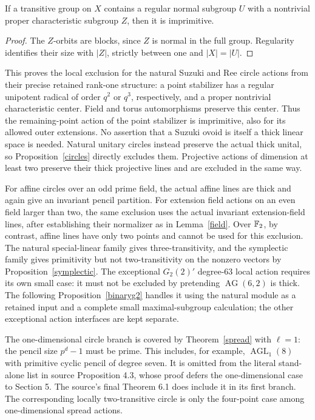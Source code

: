 \begin{lemma}
If a transitive group on $X$ contains a regular normal subgroup $U$
with a nontrivial proper characteristic subgroup $Z$, then it is
imprimitive.
\end{lemma}
\begin{proof}
The $Z$-orbits are blocks, since $Z$ is normal in the full group.
Regularity identifies their size with $|Z|$, strictly between one and
$|X|=|U|$.
\end{proof}

This proves the local exclusion for the natural Suzuki and Ree circle
actions from their precise retained rank-one structure: a point
stabilizer has a regular unipotent radical of order $q^2$ or $q^3$,
respectively, and a proper nontrivial characteristic center. Field and
torus automorphisms preserve this center. Thus the remaining-point
action of the point stabilizer is imprimitive, also for its allowed
outer extensions. No assertion that a Suzuki ovoid is itself a thick
linear space is needed. Natural unitary circles instead preserve the
actual thick unital, so Proposition~\ref{circles} directly excludes them.
Projective actions of dimension at least two preserve their thick
projective lines and are excluded in the same way.

For affine circles over an odd prime field, the actual affine lines
are thick and again give an invariant pencil partition. For extension
field actions on an even field larger than two, the same exclusion
uses the actual invariant extension-field lines, after establishing
their normalizer as in Lemma~\ref{field}. Over $\mathbb F_2$, by contrast,
affine lines have only two points and cannot be used for this exclusion.
The natural special-linear family gives three-transitivity, and the
symplectic family gives primitivity but not two-transitivity on the
nonzero vectors by Proposition~\ref{symplectic}. The exceptional
$G_2(2)'$ degree-63 local action requires its own small case: it must
not be excluded by pretending $\operatorname{AG}(6,2)$ is thick.
The following Proposition~\ref{binaryg2} handles it using the natural
module as a retained input and a complete small maximal-subgroup
calculation; the other exceptional action interfaces are kept separate.

The one-dimensional circle branch is covered by Theorem~\ref{spread}
with $\ell=1$: the pencil size $p^d-1$ must be prime. This includes,
for example, $\operatorname{AGL}_1(8)$ with primitive cyclic pencil
of degree seven. It is omitted from the literal stand-alone list in
source Proposition 4.3, whose proof defers the one-dimensional case
to Section 5. The source's final Theorem 6.1 does include it in its
first branch. The corresponding locally two-transitive circle is
only the four-point case among one-dimensional spread actions.

